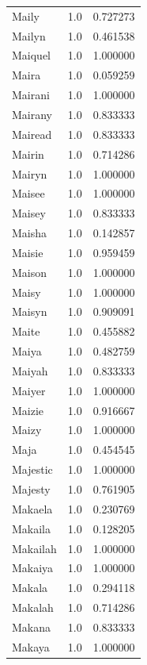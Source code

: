 \documentclass[
  letterpaper,
  DIV=11,
  numbers=noendperiod]{scrreprt}
\begin{document}
\begin{tabular}{lrr}
Maily           &   1.0 &   0.727273 \\
Mailyn          &   1.0 &   0.461538 \\
Maiquel         &   1.0 &   1.000000 \\
Maira           &   1.0 &   0.059259 \\
Mairani         &   1.0 &   1.000000 \\
Mairany         &   1.0 &   0.833333 \\
Mairead         &   1.0 &   0.833333 \\
Mairin          &   1.0 &   0.714286 \\
Mairyn          &   1.0 &   1.000000 \\
Maisee          &   1.0 &   1.000000 \\
Maisey          &   1.0 &   0.833333 \\
Maisha          &   1.0 &   0.142857 \\
Maisie          &   1.0 &   0.959459 \\
Maison          &   1.0 &   1.000000 \\
Maisy           &   1.0 &   1.000000 \\
Maisyn          &   1.0 &   0.909091 \\
Maite           &   1.0 &   0.455882 \\
Maiya           &   1.0 &   0.482759 \\
Maiyah          &   1.0 &   0.833333 \\
Maiyer          &   1.0 &   1.000000 \\
Maizie          &   1.0 &   0.916667 \\
Maizy           &   1.0 &   1.000000 \\
Maja            &   1.0 &   0.454545 \\
Majestic        &   1.0 &   1.000000 \\
Majesty         &   1.0 &   0.761905 \\
Makaela         &   1.0 &   0.230769 \\
Makaila         &   1.0 &   0.128205 \\
Makailah        &   1.0 &   1.000000 \\
Makaiya         &   1.0 &   1.000000 \\
Makala          &   1.0 &   0.294118 \\
Makalah         &   1.0 &   0.714286 \\
Makana          &   1.0 &   0.833333 \\
Makaya          &   1.0 &   1.000000 \\

\end{tabular}
\end{document}
